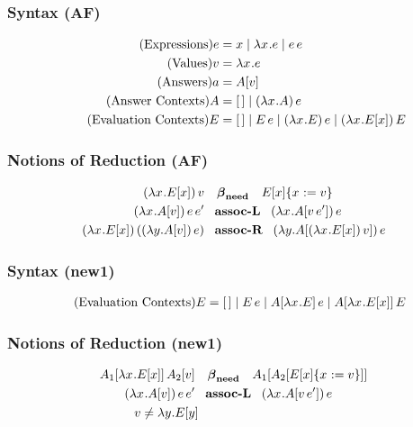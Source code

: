 \documentclass{article}
\begin{document}
\subsubsection*{Syntax (AF)}
\begin{align*}
  \tag{Expressions}
  \e   &= x \mid \lxe \mid \ap{\e}{\e} \\
  \tag{Values}
  \val &= \lxe \\
  \tag{Answers}
  \ans &= \Av \\
  \tag{Answer Contexts}
  \A   &= \hole \mid \app{\lx{\A}}{\e} \\
  \tag{Evaluation Contexts}
  \E   &= \hole \mid \ap{\E}{\e} \mid \app{\lx{\E}}{\e} \mid \app{\lxEx}{\E} 
\end{align*}


\subsubsection*{Notions of Reduction (AF)}
\begin{align*}
\nr{ \app{\lxEx}{\val} }
   { \betaneednr }
   { \substx{\Ex}{\val} } \\
\nr{ \app{\lxAv}{\ap{\e}{\e'}} }
   { \assocLnr }
   { \app{\lx{\inA{\ap{\val}{\e'}}}}{\e} } \\
\nr{ \appp{\lxEx}{\app{\lm{y}{\Av}}{\e}} }
   { \assocRnr }
   { \app{\lm{y}{\inA{\app{\lxEx}{\val}}}}{\e} }
\end{align*}



\subsubsection*{Syntax (new1)}
\begin{align*}
  \tag{Evaluation Contexts}
  \E   &= \hole \mid \ap{\E}{\e} \mid \ap{\inA{\lx{\E}}}{\e}
                \mid \ap{\inA{\lxEx}}{\E}
\end{align*}


\subsubsection*{Notions of Reduction (new1)}
\begin{align*}
\nr{ \ap{\inA[_1]{\lxEx}}{\inA[_2]{\val}} }
   { \betaneednr }
   { \inA[_1]{\inA[_2]{\substx{\Ex}{\val}}} } \\
\nr{ \app{\lxAv}{\ap{\e}{\e'}} }
   { \assocLnr }
   { \app{\lx{\inA{\ap{\val}{\e'}}}}{\e} } \\
v \neq \lyEy\;\;& \\
\end{align*}



\end{document}
